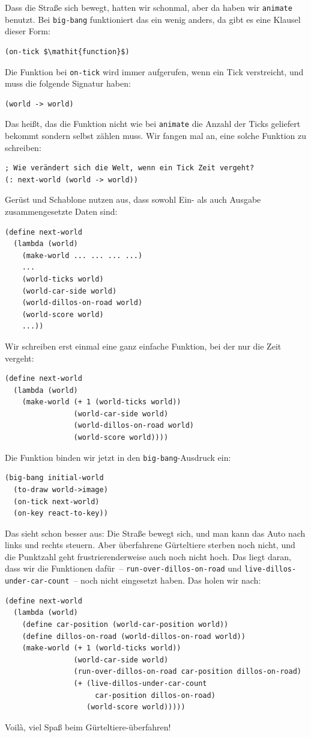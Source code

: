 Dass die Straße sich bewegt, hatten wir schonmal, aber da haben wir
\lstinline{animate} benutzt.  Bei \lstinline{big-bang} funktioniert
das ein wenig anders, da gibt es eine Klausel dieser Form:
%
\begin{lstlisting}
(on-tick $\mathit{function}$)
\end{lstlisting}
%
Die Funktion bei \lstinline{on-tick} wird immer aufgerufen, wenn ein
Tick verstreicht, und muss die folgende Signatur haben:
%
\begin{lstlisting}
(world -> world)
\end{lstlisting}
%
Das heißt, das die Funktion nicht wie bei \lstinline{animate} die
Anzahl der Ticks geliefert bekommt sondern selbst zählen muss.  Wir
fangen mal an, eine solche Funktion zu schreiben:
%
\begin{lstlisting}
; Wie verändert sich die Welt, wenn ein Tick Zeit vergeht?
(: next-world (world -> world))
\end{lstlisting}
%
Gerüst und Schablone nutzen aus, dass sowohl Ein- als auch Ausgabe
zusammengesetzte Daten sind:
%
\begin{lstlisting}
(define next-world
  (lambda (world)
    (make-world ... ... ... ...)
    ...
    (world-ticks world)
    (world-car-side world)
    (world-dillos-on-road world)
    (world-score world)
    ...))
\end{lstlisting}
%
Wir schreiben erst einmal eine ganz einfache Funktion, bei der nur die
Zeit vergeht:
%
\begin{lstlisting}
(define next-world
  (lambda (world)
    (make-world (+ 1 (world-ticks world))
                (world-car-side world)
                (world-dillos-on-road world)
                (world-score world))))
\end{lstlisting}
%
Die Funktion binden wir jetzt in den \lstinline{big-bang}-Ausdruck ein:
%
\begin{lstlisting}
(big-bang initial-world
  (to-draw world->image)
  (on-tick next-world)
  (on-key react-to-key))
\end{lstlisting}
%
Das sieht schon besser aus: Die Straße bewegt sich, und man kann das
Auto nach links und rechts steuern.  Aber überfahrene Gürteltiere
sterben noch nicht, und die Punktzahl geht frustrierenderweise auch
noch nicht hoch.  Das liegt daran, dass wir die Funktionen dafür~--
\lstinline{run-over-dillos-on-road} und
\lstinline{live-dillos-under-car-count}~-- noch nicht eingesetzt
haben.  Das holen wir nach:
%
\begin{lstlisting}
(define next-world
  (lambda (world)
    (define car-position (world-car-position world))
    (define dillos-on-road (world-dillos-on-road world))
    (make-world (+ 1 (world-ticks world))
                (world-car-side world)
                (run-over-dillos-on-road car-position dillos-on-road)
                (+ (live-dillos-under-car-count
                     car-position dillos-on-road)
                   (world-score world)))))
\end{lstlisting}
%
Voil\`a, viel Spaß beim Gürteltiere-überfahren!

